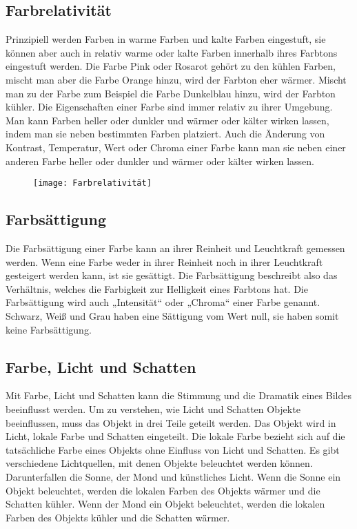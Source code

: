 \subsection{Farbrelativität}
Prinzipiell werden Farben in warme Farben und kalte Farben eingestuft, sie können aber auch in relativ warme oder kalte Farben innerhalb ihres Farbtons eingestuft werden. Die Farbe Pink oder Rosarot gehört zu den kühlen Farben, mischt man aber die Farbe Orange hinzu, wird der Farbton eher wärmer. Mischt man zu der Farbe zum Beispiel die Farbe Dunkelblau hinzu, wird der Farbton kühler. Die Eigenschaften einer Farbe sind immer relativ zu ihrer Umgebung. Man kann Farben heller oder dunkler und wärmer oder kälter wirken lassen, indem man sie neben bestimmten Farben platziert. Auch die Änderung von Kontrast, Temperatur, Wert oder Chroma einer Farbe kann man sie neben einer anderen Farbe heller oder dunkler und wärmer oder kälter wirken lassen. 
\cite{mollica2018special}

\begin{figure}[H]
	\centering
	\texttt{[image: Farbrelativität]}
	\caption{\cite{mollica2018special}}
\end{figure}

\subsection{Farbsättigung}
Die Farbsättigung einer Farbe kann an ihrer Reinheit und Leuchtkraft gemessen werden. Wenn eine Farbe weder in ihrer Reinheit noch in ihrer Leuchtkraft gesteigert werden kann, ist sie gesättigt. Die Farbsättigung beschreibt also das Verhältnis, welches die Farbigkeit zur Helligkeit eines Farbtons hat. Die Farbsättigung wird auch „Intensität“ oder „Chroma“ einer Farbe genannt. Schwarz, Weiß und Grau haben eine Sättigung vom Wert null, sie haben somit keine Farbsättigung.
\cite{mollica2018special}

\subsection{Farbe, Licht und Schatten}
Mit Farbe, Licht und Schatten kann die Stimmung und die Dramatik eines Bildes beeinflusst werden. Um zu verstehen, wie Licht und Schatten Objekte beeinflussen, muss das Objekt in drei Teile geteilt werden. Das Objekt wird in Licht, lokale Farbe und Schatten eingeteilt. Die lokale Farbe bezieht sich auf die tatsächliche Farbe eines Objekts ohne Einfluss von Licht und Schatten. Es gibt verschiedene Lichtquellen, mit denen Objekte beleuchtet werden können. Darunterfallen die Sonne, der Mond und künstliches Licht. Wenn die Sonne ein Objekt beleuchtet, werden die lokalen Farben des Objekts wärmer und die Schatten kühler. Wenn der Mond ein Objekt beleuchtet, werden die lokalen Farben des Objekts kühler und die Schatten wärmer.
\cite{mollica2018special}

